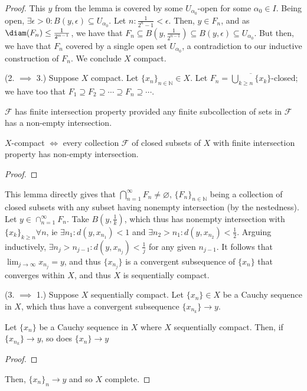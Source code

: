 \begin{proof}
    This $y$ from the lemma is covered by some $U_{\alpha_0}$-open for some $\alpha_0 \in I$. Being open, $\exists \epsilon > 0 : B(y, \epsilon) \subseteq U_{\alpha_0}$. Let $n : \frac{1}{2^n-1} < \epsilon.$ Then, $y \in F_n$, and as $\diam(F_n) \leq \frac{1}{2^{n-1}}$, we have that $F_n \subseteq B(y, \frac{1}{2^{n-1}}) \subseteq B(y, \epsilon) \subseteq U_{\alpha_0}$. But then, we have that $F_n$ covered by a single open set $U_{\alpha_0}$, a contradiction to our inductive construction of $F_n$. We conclude $X$ compact.

    \noindent (2. $\implies$ 3.) Suppose $X$ compact. Let $\{x_n\}_{n \in \mathbb{N}} \in X$. Let $F_n = \overline{\bigcup_{k\geq n} \{x_k\}}$-closed; we have too that $F_1 \supseteq F_2 \supseteq \cdots \supseteq F_n \supseteq \cdots$.  

    \begin{definition}
        $\mathcal{F}$ has finite intersection property provided any finite subcollection of sets in $\mathcal{F}$ has a non-empty intersection.
    \end{definition}

    \begin{lemma-inline}
        $X$-compact $\iff$ every collection $\mathcal{F}$ of closed subsets of $X$ with finite intersection property has non-empty intersection.
    \end{lemma-inline}
    \begin{proof}
    \end{proof}
    
    This lemma directly gives that $\bigcap_{n=1}^\infty F_n \neq \varnothing$, $\{F_n\}_{n \in \mathbb{N}}$ being a collection of closed subsets with any subset having nonempty intersection (by the nestedness). Let $y \in \cap_{n=1}^\infty F_n$. Take $B(y, \frac{1}{k})$, which thus has nonempty intersection with $\{x_k\}_{k \geq n} \forall n$, ie $\exists n_1 : d(y, x_{n_1}) < 1$ and $\exists n_2 > n_1 : d(y, x_{n_2}) < \frac{1}{2}$. Arguing inductively, $\exists n_j > n_{j-1} : d(y, x_{n_j}) < \frac{1}{j}$ for any given $n_{j-1}$. It follows that $\lim_{j \to \infty} x_{n_j} = y$, and thus $\{x_{n_j}\}$ is a convergent subsequence of $\{x_n\}$ that converges within $X$, and thus $X$ is sequentially compact.

    \noindent(3. $\implies$ 1.) Suppose $X$ sequentially compact. Let $\{x_n\} \in X$ be a Cauchy sequence in $X$, which thus have a convergent subsequence $\{x_{n_k}\} \to y$.
    \begin{lemma-inline}
        Let $\{x_n\}$ be a Cauchy sequence in $X$ where $X$ sequentially compact. Then, if $\{x_{n_k}\} \to y$, so does $\{x_n\} \to y$ 
    \end{lemma-inline}
    \begin{proof}
    \end{proof}
    Then, $\{x_n\}_n \to y$ and so $X$ complete. %


\end{proof}
